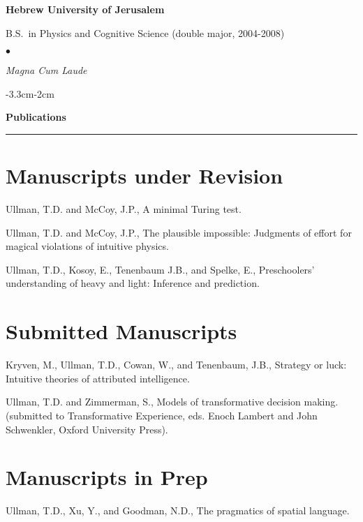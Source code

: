 \documentclass[margin,line,pifont,palatino,courier]{res}
\newenvironment{list1}{
  \begin{list}{\ding{113}}{%
      \setlength{\itemsep}{0in}
      \setlength{\parsep}{0in} \setlength{\parskip}{0in}
      \setlength{\topsep}{0in} \setlength{\partopsep}{0in}
      \setlength{\leftmargin}{0.17in}}}{\end{list}}
\newenvironment{list2}{
  \begin{list}{$\bullet$}{%
      \setlength{\itemsep}{0in}
      \setlength{\parsep}{0in} \setlength{\parskip}{0in}
      \setlength{\topsep}{0in} \setlength{\partopsep}{0in}
      \setlength{\leftmargin}{0.2in}}}{\end{list}}
\begin{document}
\begin{resume}
{\bf Hebrew University of Jerusalem}\\
\vspace*{-.1in}
\begin{list1}
\item[] B.S.~in Physics and Cognitive Science (double major, 2004-2008)

\begin{list2}
\vspace*{.05in}
\item \textit{Magna Cum Laude}
\end{list2}

\end{list1}

\begin{adjustwidth*}{-3.3cm}{-2cm}

\textbf{Publications}\\
\noindent\rule{8cm}{0.4pt}

\end{adjustwidth*}

\section{\sc Manuscripts under Revision}

Ullman, T.D. and McCoy, J.P., A minimal Turing test.

Ullman, T.D. and McCoy, J.P., The plausible impossible: Judgments of effort for magical violations of intuitive physics.

Ullman, T.D., Kosoy, E., Tenenbaum J.B., and Spelke, E., Preschoolers' understanding of heavy and light: Inference and prediction. 

\section{\sc Submitted Manuscripts}

Kryven, M., Ullman, T.D., Cowan, W., and Tenenbaum, J.B., Strategy or luck: Intuitive theories of attributed intelligence.

Ullman, T.D. and Zimmerman, S., Models of transformative decision making. \\(submitted to Transformative Experience, eds. Enoch Lambert and John Schwenkler, Oxford University Press).

\section{\sc Manuscripts in Prep}
Ullman, T.D., Xu, Y., and Goodman, N.D., The pragmatics of spatial language. 



\end{resume}
\end{document}
